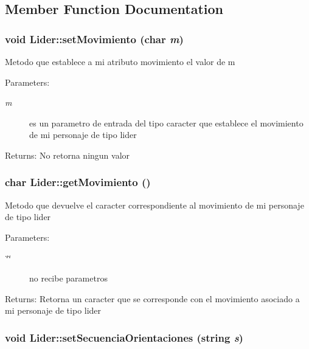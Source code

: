 \subsection{Member Function Documentation}
\hypertarget{classLider_8b7b93efc0b6cecbab4ae82992ebcd11}{
\subsubsection[setMovimiento]{\setlength{\rightskip}{0pt plus 5cm}void Lider::setMovimiento (char {\em m})}}
\label{classLider_8b7b93efc0b6cecbab4ae82992ebcd11}


Metodo que establece a mi atributo movimiento el valor de m \begin{Desc}
\item[Parameters:]
\begin{description}
\item[{\em m}]es un parametro de entrada del tipo caracter que establece el movimiento de mi personaje de tipo lider \end{description}
\end{Desc}
\begin{Desc}
\item[Returns:]No retorna ningun valor \end{Desc}
\hypertarget{classLider_2fb77f30c5ebb7bce39dc7ee4711d4d2}{
\subsubsection[getMovimiento]{\setlength{\rightskip}{0pt plus 5cm}char Lider::getMovimiento ()}}
\label{classLider_2fb77f30c5ebb7bce39dc7ee4711d4d2}


Metodo que devuelve el caracter correspondiente al movimiento de mi personaje de tipo lider \begin{Desc}
\item[Parameters:]
\begin{description}
\item[{\em \char`\"{}\char`\"{}}]no recibe parametros \end{description}
\end{Desc}
\begin{Desc}
\item[Returns:]Retorna un caracter que se corresponde con el movimiento asociado a mi personaje de tipo lider \end{Desc}
\hypertarget{classLider_84acf3920a695ab792f9bbcb494ea7c8}{
\subsubsection[setSecuenciaOrientaciones]{\setlength{\rightskip}{0pt plus 5cm}void Lider::setSecuenciaOrientaciones (string {\em s})}}
\label{classLider_84acf3920a695ab792f9bbcb494ea7c8}


